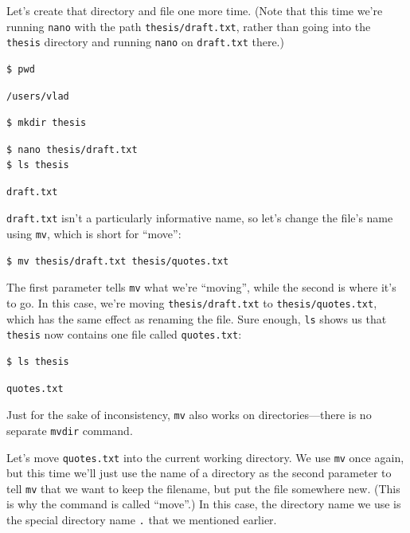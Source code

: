 \documentclass{book}
\begin{document}
Let's create that directory and file one more time. (Note that this time
we're running \texttt{nano} with the path \texttt{thesis/draft.txt},
rather than going into the \texttt{thesis} directory and running
\texttt{nano} on \texttt{draft.txt} there.)

\begin{verbatim}
$ pwd
\end{verbatim}

\begin{verbatim}
/users/vlad
\end{verbatim}

\begin{verbatim}
$ mkdir thesis
\end{verbatim}

\begin{verbatim}
$ nano thesis/draft.txt
$ ls thesis
\end{verbatim}

\begin{verbatim}
draft.txt
\end{verbatim}

\texttt{draft.txt} isn't a particularly informative name, so let's
change the file's name using \texttt{mv}, which is short for ``move'':

\begin{verbatim}
$ mv thesis/draft.txt thesis/quotes.txt
\end{verbatim}

The first parameter tells \texttt{mv} what we're ``moving'', while the
second is where it's to go. In this case, we're moving
\texttt{thesis/draft.txt} to \texttt{thesis/quotes.txt}, which has the
same effect as renaming the file. Sure enough, \texttt{ls} shows us that
\texttt{thesis} now contains one file called \texttt{quotes.txt}:

\begin{verbatim}
$ ls thesis
\end{verbatim}

\begin{verbatim}
quotes.txt
\end{verbatim}

Just for the sake of inconsistency, \texttt{mv} also works on
directories---there is no separate \texttt{mvdir} command.

Let's move \texttt{quotes.txt} into the current working directory. We
use \texttt{mv} once again, but this time we'll just use the name of a
directory as the second parameter to tell \texttt{mv} that we want to
keep the filename, but put the file somewhere new. (This is why the
command is called ``move''.) In this case, the directory name we use is
the special directory name \texttt{.} that we mentioned earlier.
\end{document}

